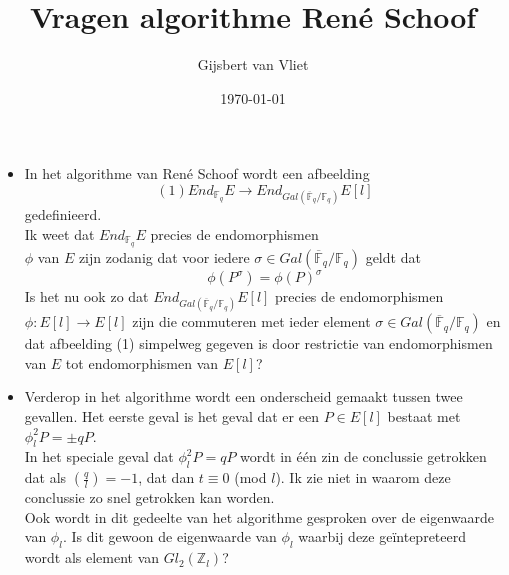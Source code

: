 \documentclass{article}
\begin{document}
\title{Vragen algorithme Ren\'e Schoof}
\author{Gijsbert van Vliet}
\date{\today}
\maketitle

\begin{itemize}
\item In het algorithme van Ren\'e Schoof wordt een afbeelding $$(1) End_{\mathbb{F}_q}E \rightarrow End_{Gal(\overline{\mathbb{F}}_q/\mathbb{F}_q)} E[l]$$ gedefinieerd.\\
Ik weet dat $End_{\mathbb{F}_q}E$ precies de endomorphismen\\ $\phi$ van $E$ zijn zodanig dat voor iedere $\sigma \in Gal(\overline{\mathbb{F}}_q/\mathbb{F}_q)$ geldt dat $$\phi(P^\sigma) = \phi(P)^\sigma$$
Is het nu ook zo dat $End_{Gal(\overline{\mathbb{F}}_q/\mathbb{F}_q)} E[l]$ precies de endomorphismen $\phi: E[l] \rightarrow E[l]$ zijn die commuteren met ieder element $\sigma \in Gal(\overline{\mathbb{F}}_q/\mathbb{F}_q)$ en dat afbeelding (1) simpelweg gegeven is door restrictie van endomorphismen van $E$ tot endomorphismen van $E[l]$?
\item Verderop in het algorithme wordt een onderscheid gemaakt tussen twee gevallen. Het eerste geval is het geval dat er een $P \in E[l]$ bestaat met $\phi_l^2P = \pm qP$.\\
In het speciale geval dat $\phi_l^2P = qP$ wordt in \'e\'en zin de conclussie getrokken dat als $\left(\frac{q}{l}\right)=-1$, dat dan $t \equiv 0$ (mod $l$). Ik zie niet in waarom deze conclussie zo snel getrokken kan worden.\\
Ook wordt in dit gedeelte van het algorithme gesproken over de eigenwaarde van $\phi_l$. Is dit gewoon de eigenwaarde van $\phi_l$ waarbij deze ge\"intepreteerd wordt als element van $Gl_2(\mathbb{Z}_l)$?
\end{itemize}
\end{document}
